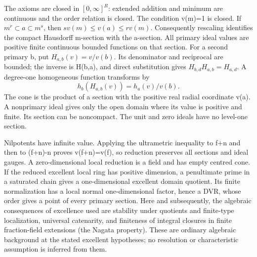 \documentclass[11pt]{article}
\begin{document}
The axioms are closed in \([0,\infty]^R\): extended addition and minimum are continuous and the order relation is closed. The condition v(m)=1 is closed. If \(m^r\subset a\subset m^s\), then \(s v(m)\le v(a)\le r v(m)\). Consequently rescaling identifies the compact Hausdorff m-section with the a-section. All primary ideal values are positive finite continuous bounded functions on that section. For a second primary b, put \(H_{a,b}(v)=v/v(b)\). Its denominator and reciprocal are bounded; the inverse is H(b,a), and direct substitution gives \(H_{b,d}H_{a,b}=H_{a,d}\). A degree-one homogeneous function transforms by
\[
 h_b(H_{a,b}(v))=h_a(v)/v(b).
\]
The cone is the product of a section with the positive real radial coordinate v(a). A nonprimary ideal gives only the open domain where its value is positive and finite. Its section can be noncompact. The unit and zero ideals have no level-one section.

Nilpotents have infinite value. Applying the ultrametric inequality to f+n and then to (f+n)-n proves v(f+n)=v(f), so reduction preserves all sections and ideal gauges. A zero-dimensional local reduction is a field and has empty centred cone. If the reduced excellent local ring has positive dimension, a penultimate prime in a saturated chain gives a one-dimensional excellent domain quotient. Its finite normalization has a local normal one-dimensional factor, hence a DVR, whose order gives a point of every primary section. Here and subsequently, the algebraic consequences of excellence used are stability under quotients and finite-type localization, universal catenarity, and finiteness of integral closures in finite fraction-field extensions (the Nagata property). These are ordinary algebraic background at the stated excellent hypotheses; no resolution or characteristic assumption is inferred from them.
\end{document}

